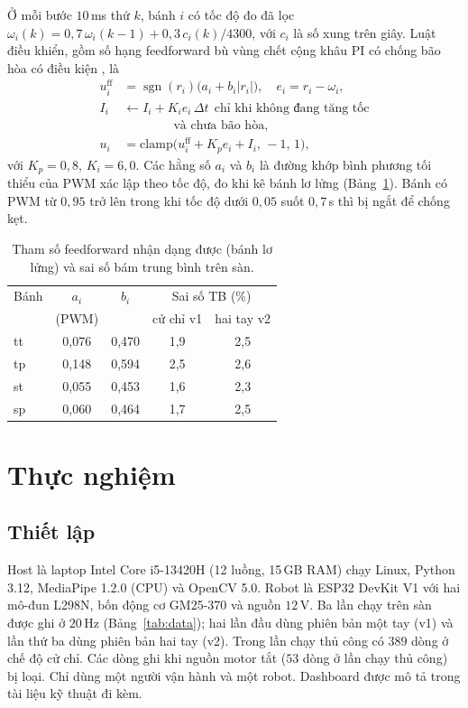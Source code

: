 \documentclass[5p,twocolumn]{elsarticle}
\begin{document}
Ở mỗi bước $10$\,ms thứ $k$, bánh $i$ có tốc độ đo đã lọc $\omega_i(k)=0{,}7\,\omega_i(k-1)+0{,}3\,c_i(k)/4300$, với $c_i$ là số xung trên giây. Luật điều khiển, gồm số hạng feedforward bù vùng chết \cite{tao1996} cộng khâu PI có chống bão hòa có điều kiện \cite{astrom2006}, là
\begin{align}
u^{\mathrm{ff}}_i&=\operatorname{sgn}(r_i)\bigl(a_i+b_i|r_i|\bigr),\quad e_i=r_i-\omega_i,\nonumber\\
I_i&\leftarrow I_i+K_i e_i\,\Delta t\ \ \text{chỉ khi không đang tăng tốc}\nonumber\\
&\qquad\qquad\text{và chưa bão hòa},\nonumber\\
u_i&=\mathrm{clamp}\bigl(u^{\mathrm{ff}}_i+K_p e_i+I_i,\,-1,\,1\bigr),\label{eq:ctrl}
\end{align}
với $K_p=0{,}8$, $K_i=6{,}0$. Các hằng số $a_i$ và $b_i$ là đường khớp bình phương tối thiểu của PWM xác lập theo tốc độ, đo khi kê bánh lơ lửng (Bảng~\ref{tab:ff}). Bánh có PWM từ $0{,}95$ trở lên trong khi tốc độ dưới $0{,}05$ suốt $0{,}7$\,s thì bị ngắt để chống kẹt.

\begin{table}[!t]
\caption{Tham số feedforward nhận dạng được (bánh lơ lửng) và sai số bám trung bình trên sàn.}
\label{tab:ff}
\centering
\small
\begin{tabular}{lcccc}
\toprule
Bánh & $a_i$ & $b_i$ & \multicolumn{2}{c}{Sai số TB (\%)} \\
 & (PWM) & & cử chỉ v1 & hai tay v2 \\
\midrule
tt & 0,076 & 0,470 & 1,9 & 2,5 \\
tp & 0,148 & 0,594 & 2,5 & 2,6 \\
st & 0,055 & 0,453 & 1,6 & 2,3 \\
sp & 0,060 & 0,464 & 1,7 & 2,5 \\
\bottomrule
\end{tabular}
\end{table}

\section{Thực nghiệm}\label{sec:experiments}
\subsection{Thiết lập}\label{sec:setup}
Host là laptop Intel Core i5-13420H (12 luồng, 15\,GB RAM) chạy Linux, Python 3.12, MediaPipe 1.2.0 (CPU) và OpenCV 5.0. Robot là ESP32 DevKit V1 với hai mô-đun L298N, bốn động cơ GM25-370 và nguồn $12$\,V. Ba lần chạy trên sàn được ghi ở $20$\,Hz (Bảng~\ref{tab:data}); hai lần đầu dùng phiên bản một tay (v1) và lần thứ ba dùng phiên bản hai tay (v2). Trong lần chạy thủ công có $389$ dòng ở chế độ cử chỉ. Các dòng ghi khi nguồn motor tắt ($53$ dòng ở lần chạy thủ công) bị loại. Chỉ dùng một người vận hành và một robot. Dashboard được mô tả trong tài liệu kỹ thuật đi kèm.
\end{document}
